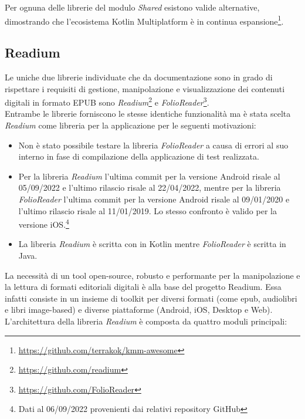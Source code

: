 Per ognuna delle librerie del modulo \textit{Shared} esistono valide alternative, dimostrando che l'ecosistema Kotlin Multiplatform è in continua espansione\footnote{\url{https://github.com/terrakok/kmm-awesome}}.

\subsection{Readium}
Le uniche due librerie individuate che da documentazione sono in grado di rispettare i requisiti di gestione, manipolazione e visualizzazione dei contenuti digitali in formato EPUB sono \textit{Readium}\footnote{\url{https://github.com/readium}} e \textit{FolioReader}\footnote{\url{https://github.com/FolioReader}}.\\
Entrambe le librerie forniscono le stesse identiche funzionalità ma è stata scelta \textit{Readium} come libreria per la applicazione per le seguenti motivazioni:
\begin{itemize}
    \item Non è stato possibile testare la libreria \textit{FolioReader} a causa di errori al suo interno in fase di compilazione della applicazione di test realizzata.
    \item Per la libreria \textit{Readium} l'ultima commit per la versione Android risale al 05/09/2022 e l'ultimo rilascio risale al 22/04/2022, mentre per la libreria \textit{FolioReader} l'ultima commit per la versione Android risale al 09/01/2020 e l'ultimo rilascio risale al 11/01/2019. Lo stesso confronto è valido per la versione iOS.\footnote{Dati al 06/09/2022 provenienti dai relativi repository GitHub}
    \item La libreria \textit{Readium} è scritta con in Kotlin mentre \textit{FolioReader} è scritta in Java.
\end{itemize}
La necessità di un tool open-source, robusto e performante per la manipolazione e la lettura di formati editoriali digitali è alla base del progetto Readium. Essa infatti consiste in un insieme di toolkit per diversi formati (come epub, audiolibri e libri image-based) e diverse piattaforme (Android, iOS, Desktop e Web).\\
L'architettura della libreria \textit{Readium} è composta da quattro moduli principali:
